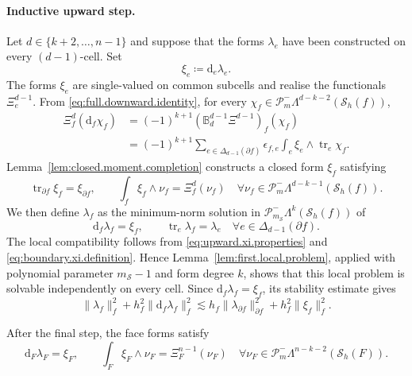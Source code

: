 \documentclass[a4paper,11pt]{article}
\theoremstyle{definition}
\newcommand{\DIFF}{\mathrm{d}}
\newcommand{\Sh}{\mathcal{S}_h}
\newcommand{\FM}[1]{\Delta_{#1}}
\newcommand{\PLtrim}[2]{\mathcal{P}_{#1}^{-}\Lambda^{#2}}
\newcommand{\trc}{\operatorname{tr}}
\begin{document}
\paragraph{Inductive upward step.}
Let $d\in\{k+2,\ldots,n-1\}$ and suppose that the forms $\lambda_e$ have been constructed on every $(d-1)$-cell.
Set
\begin{equation}\label{eq:boundary.xi.definition}
  \xi_e\coloneqq\DIFF_e\lambda_e.
\end{equation}
The forms $\xi_e$ are single-valued on common subcells and realise the functionals $\Xi_e^{d-1}$.
From \eqref{eq:full.downward.identity}, for every $\chi_f\in\PLtrim{m}{d-k-2}(\Sh(f))$,
\[
\begin{aligned}
  \Xi_f^d(\DIFF_f\chi_f)
  &={}
  (-1)^{k+1}
  (\mathbb B_d^{d-1}\Xi^{d-1})_f(\chi_f)
  \\
  &={}
  (-1)^{k+1}
  \sum_{e\in\FM{d-1}(\partial f)}
  \epsilon_{f,e}
  \int_e\xi_e\wedge\trc_e\chi_f.
\end{aligned}
\]
Lemma~\ref{lem:closed.moment.completion} constructs a closed form $\xi_f$ satisfying
\begin{equation}\label{eq:upward.xi.properties}
  \trc_{\partial f}\xi_f=\xi_{\partial f},
  \qquad
  \int_f\xi_f\wedge\nu_f
  =
  \Xi_f^d(\nu_f)
  \quad
  \forall\nu_f\in\PLtrim{m}{d-k-1}(\Sh(f)).
\end{equation}
We then define $\lambda_f$ as the minimum-norm solution in $\PLtrim{m_{\mathcal S}}{k}(\Sh(f))$ of
\[
  \DIFF_f\lambda_f=\xi_f,
  \qquad
  \trc_e\lambda_f=\lambda_e
  \quad
  \forall e\in\FM{d-1}(\partial f).
\]
The local compatibility follows from \eqref{eq:upward.xi.properties} and \eqref{eq:boundary.xi.definition}.
Hence Lemma~\ref{lem:first.local.problem}, applied with polynomial parameter $m_{\mathcal S}-1$ and form degree $k$, shows that this local problem is solvable independently on every cell.
Since $\DIFF_f\lambda_f=\xi_f$, its stability estimate gives
\begin{equation}\label{eq:upward.lambda.stability}
  \|\lambda_f\|_f^2
  +
  h_f^2\|\DIFF_f\lambda_f\|_f^2
  \lesssim
  h_f\|\lambda_{\partial f}\|_{\partial f}^2
  +
  h_f^2\|\xi_f\|_f^2.
\end{equation}

After the final step, the face forms satisfy
\begin{equation}\label{eq:final.face.moments}
  \DIFF_F\lambda_F=\xi_F,
  \qquad
  \int_F\xi_F\wedge\nu_F
  =
  \Xi_F^{n-1}(\nu_F)
  \quad
  \forall\nu_F\in\PLtrim{m}{n-k-2}(\Sh(F)).
\end{equation}
\end{document}
